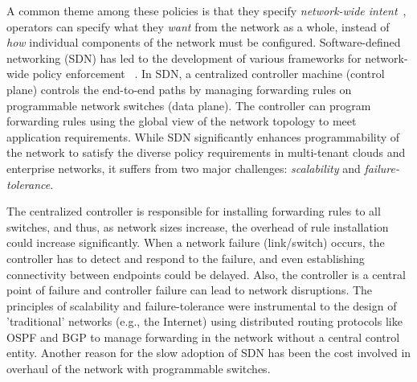 
A common theme among these policies is that 
they specify \emph{network-wide intent}~\cite{intent},
operators can specify what they \emph{want} from the network as a 
whole, instead of \emph{how} individual components of the network
must be configured. 
Software-defined networking (SDN) has led to the development 
of various frameworks for network-wide policy enforcement
~\cite{netkat, simple, merlin, fattire, genesis}. In SDN,
a centralized controller machine (control plane) controls
the end-to-end paths by managing forwarding rules on programmable
network switches (data plane). The controller can program
forwarding rules using the global view of the network
topology to meet application requirements. While SDN 
significantly enhances programmability of the network to 
satisfy the diverse policy requirements in multi-tenant
clouds and enterprise networks, it suffers from two 
major challenges: 
\emph{scalability} and \emph{failure-tolerance}. 

The centralized controller is responsible for installing 
forwarding rules to all switches, and thus, as network sizes
increase, the overhead of rule installation could increase
significantly. When a network failure (link/switch) occurs,
the controller has to detect and respond to the failure, and
even establishing connectivity between endpoints could be delayed.
Also, the controller is a central point of failure and controller
failure can lead to network disruptions. 
The principles of scalability and failure-tolerance 
were instrumental to the design
of 'traditional' networks (e.g., the Internet) using distributed
routing protocols like OSPF and BGP to manage forwarding in the 
network without a central control entity. Another reason for the 
slow adoption of SDN has been the cost involved in overhaul 
of the network with programmable switches.  

